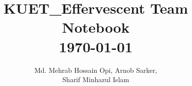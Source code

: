 \documentclass[8pt, a4paper, onesided]{article}
\title{\vspace{-2.5ex}\Large{KUET\_Effervescent Team Notebook\\\today}}
\author{Md. Mehrab Hossain Opi, Arnob Sarker,\\Sharif Minhazul Islam}
\date{}
\begin{document}
\begin{landscape}
\begin{multicols*}{3}

\maketitle
\vspace{-7ex}
\tableofcontents
\pagestyle{fancy}
 
\raggedbottom

\end{multicols*}
%

\end{landscape}
\end{document}
